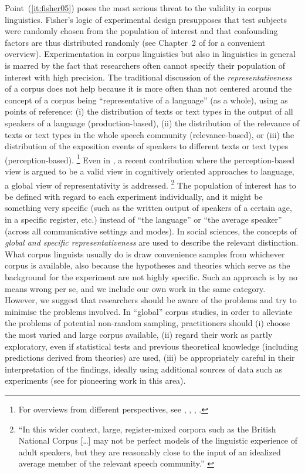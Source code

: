 Point~(\ref{it:fisher05}) poses the most serious threat to the validity in corpus linguistics.
Fisher's logic of experimental design presupposes that test subjects were randomly chosen from the population of interest and that confounding factors are thus distributed randomly (see Chapter~2 of \citealt{MaxwellDelaney2004} for a convenient overview).
Experimentation in corpus linguistics but also in linguistics in general is marred by the fact that researchers often cannot specify their population of interest with high precision.
The traditional discussion of the \textit{representativeness} of a corpus does not help because it is more often than not centered around the concept of a corpus being ``representative of a language'' (as a whole), using as points of reference:
(i) the distribution of texts or text types in the output of all speakers of a language (production-based),
(ii) the distribution of the relevance of texts or text types in the whole speech community (relevance-based), or
(iii) the distribution of the exposition events of speakers to different texts or text types (perception-based).%
\footnote{For overviews from different perspectives, see \textcite{Biber1993}, \textcite{MceneryEa2006}, \textcite{Leech2007}, \textcite{Hunston2008}.}
Even in \textcite{StefanowitschFlach2016}, a recent contribution where the perception-based view is argued to be a valid view in cognitively oriented approaches to language, a global view of representativity is addressed.%
\footnote{``In this wider context, large, register-mixed corpora such as the British National Corpus [\ldots] may not be perfect models of the linguistic experience of adult speakers, but they are reasonably close to the input of an idealized average member of the relevant speech community.'' \parencite[104]{StefanowitschFlach2016}}
The population of interest has to be defined with regard to each experiment individually, and it might be something very specific (such as the written output of speakers of a certain age, in a specific register, etc.) instead of ``the language'' or ``the average speaker'' (across all communicative settings and modes).
In social sciences, the concepts of \textit{global and specific representativeness} \citep[86]{Bortz2005} are used to describe the relevant distinction.
What corpus linguists usually do is draw convenience samples from whichever corpus is available, also because the hypotheses and theories which serve as the background for the experiment are not highly specific.
Such an approach is by no means wrong per se, and we include our own work in the same category.
However, we suggest that researchers should be aware of the problems and try to minimise the problems involved.
In ``global'' corpus studies, in order to alleviate the problems of potential non-random sampling, practitioners should
(i) choose the most varied and large corpus available,
(ii) regard their work as partly exploratory, even if statistical tests and previous theoretical knowledge (including predictions derived from theories) are used,
(iii) be appropriately careful in their interpretation of the findings, ideally using additional sources of data such as experiments (see \citealt{BresnanEa2007} for pioneering work in this area).

